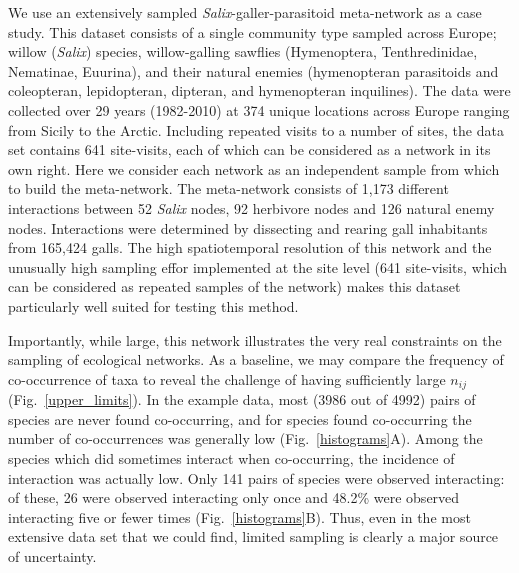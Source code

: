 \documentclass[12pt]{article}
\begin{document}
      We use an extensively sampled \emph{Salix}-galler-parasitoid meta-network as a case study. This dataset consists of a single community type sampled across Europe; willow (\emph{Salix}) species, willow-galling sawflies (Hymenoptera, Tenthredinidae, Nematinae, Euurina), and their natural enemies (hymenopteran parasitoids and coleopteran, lepidopteran, dipteran, and hymenopteran inquilines). The data were collected over 29 years (1982-2010) at 374 unique locations across Europe ranging from Sicily to the Arctic. Including repeated visits to a number of sites, the data set contains 641 site-visits, each of which can be considered as a network in its own right. Here we consider each network as an independent sample from which to build the meta-network. The meta-network consists of 1,173 different interactions between 52 \emph{Salix} nodes, 92 herbivore nodes and 126 natural enemy nodes. Interactions were determined by dissecting and rearing gall inhabitants from 165,424 galls. The high spatiotemporal resolution of this network and the unusually high sampling effor implemented at the site level (641 site-visits, which can be considered as repeated samples of the network) makes this dataset particularly well suited for testing this method.


      Importantly, while large, this network illustrates the very real constraints on the sampling of ecological networks. As a baseline, we may compare the frequency of co-occurrence of taxa to reveal the challenge of having sufficiently large $n_{ij}$ (Fig.~\ref{upper_limits}). In the example data, most (3986 out of 4992) pairs of species are never found co-occurring, and for species found co-occurring the number of co-occurrences was generally low (Fig.~\ref{histograms}A). 
      Among the species which did sometimes interact when co-occurring, the incidence of interaction was actually low. 
      Only 141 pairs of species were observed interacting: of these, 26 were observed interacting only once and 48.2\% were observed interacting five or fewer times (Fig.~\ref{histograms}B). Thus, even in the most extensive data set that we could find, limited sampling is clearly a major source of uncertainty.
\end{document}
